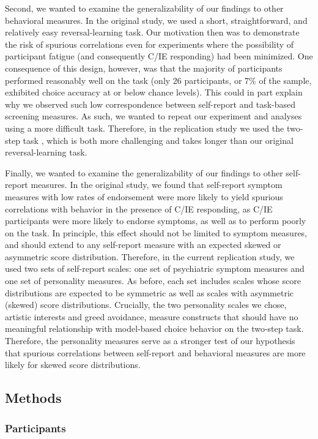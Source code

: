 \documentclass[a4paper,notitlepage,12pt]{article}
\begin{document}
\begin{refsection}[supp]
Second, we wanted to examine the generalizability of our findings to other behavioral measures. In the original study, we used a short, straightforward, and relatively easy reversal-learning task. Our motivation then was to demonstrate the risk of spurious correlations even for experiments where the possibility of participant fatigue (and consequently C/IE responding) had been minimized. One consequence of this design, however, was that the majority of participants performed reasonably well on the task (only 26 participants, or 7\% of the sample, exhibited choice accuracy at or below chance levels). This could in part explain why we observed such low correspondence between self-report and task-based screening measures. As such, we wanted to repeat our experiment and analyses using a more difficult task. Therefore, in the replication study we used the two-step task \cite{daw2011model}, which is both more challenging and takes longer than our original reversal-learning task. 

Finally, we wanted to examine the generalizability of our findings to other self-report measures. In the original study, we found that self-report symptom measures with low rates of endorsement were more likely to yield spurious correlations with behavior in the presence of C/IE responding, as C/IE participants were more likely to endorse symptoms, as well as to perform poorly on the task. In principle, this effect should not be limited to symptom measures, and should extend to any self-report measure with an expected skewed or asymmetric score distribution. Therefore, in the current replication study, we used two sets of self-report scales: one set of psychiatric symptom measures and one set of personality measures. As before, each set includes scales whose score distributions are expected to be symmetric as well as scales with asymmetric (skewed) score distributions. Crucially, the two personality scales we chose, artistic interests and greed avoidance, measure constructs that should have no meaningful relationship with model-based choice behavior on the two-step task. Therefore, the personality measures serve as a stronger test of our hypothesis that spurious correlations between self-report and behavioral measures are more likely for skewed score distributions. 

\subsection*{Methods}

\subsubsection*{Participants}


\end{refsection}
\end{document}
